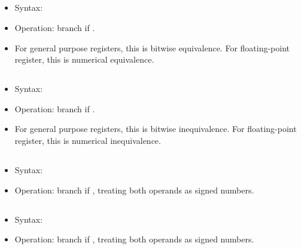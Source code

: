 \subsection{}

\begin{itemize}
  \item Syntax: 
  \item Operation: branch if .
  \item For general purpose registers, this is bitwise equivalence. For
        floating-point register, this is numerical equivalence.
\end{itemize}

\subsection{}

\begin{itemize}
  \item Syntax: 
  \item Operation: branch if .
  \item For general purpose registers, this is bitwise inequivalence. For
        floating-point register, this is numerical inequivalence.
\end{itemize}

\subsection{}

\begin{itemize}
  \item Syntax: 
  \item Operation: branch if , treating both operands as signed
        numbers.
\end{itemize}

\subsection{}

\begin{itemize}
  \item Syntax: 
  \item Operation: branch if , treating both operands as signed
        numbers.
\end{itemize}

